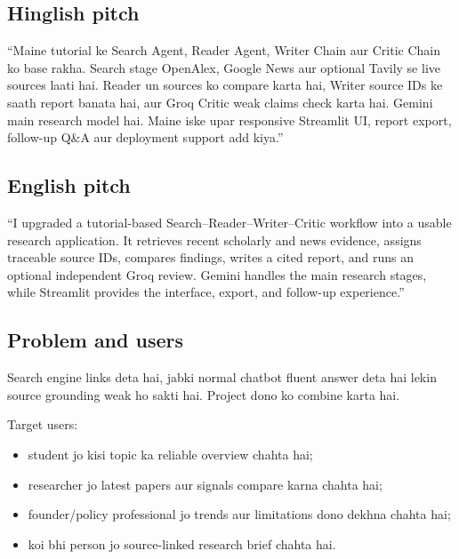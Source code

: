 \documentclass[11pt,a4paper]{article}
\begin{document}
\subsection{Hinglish pitch}

\begin{answerbox}
``Maine tutorial ke Search Agent, Reader Agent, Writer Chain aur Critic Chain ko base rakha. Search stage OpenAlex, Google News aur optional Tavily se live sources laati hai. Reader un sources ko compare karta hai, Writer source IDs ke saath report banata hai, aur Groq Critic weak claims check karta hai. Gemini main research model hai. Maine iske upar responsive Streamlit UI, report export, follow-up Q\&A aur deployment support add kiya.''
\end{answerbox}

\subsection{English pitch}

\begin{answerbox}
``I upgraded a tutorial-based Search--Reader--Writer--Critic workflow into a usable research application. It retrieves recent scholarly and news evidence, assigns traceable source IDs, compares findings, writes a cited report, and runs an optional independent Groq review. Gemini handles the main research stages, while Streamlit provides the interface, export, and follow-up experience.''
\end{answerbox}

\subsection{Problem and users}

Search engine links deta hai, jabki normal chatbot fluent answer deta hai lekin source grounding weak ho sakti hai. Project dono ko combine karta hai.

Target users:

\begin{itemize}
  \item student jo kisi topic ka reliable overview chahta hai;
  \item researcher jo latest papers aur signals compare karna chahta hai;
  \item founder/policy professional jo trends aur limitations dono dekhna chahta hai;
  \item koi bhi person jo source-linked research brief chahta hai.
\end{itemize}
\end{document}
